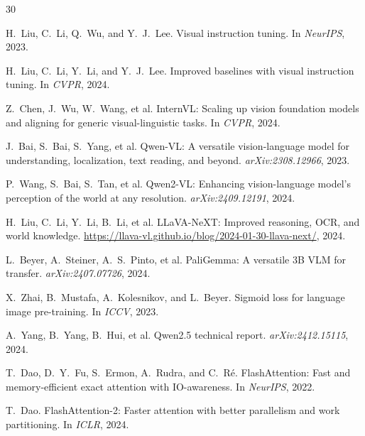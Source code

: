 \documentclass[11pt,a4paper]{article}
\begin{document}
\begin{thebibliography}{30}

H.~Liu, C.~Li, Q.~Wu, and Y.~J.~Lee.
\newblock Visual instruction tuning.
\newblock In \emph{NeurIPS}, 2023.

H.~Liu, C.~Li, Y.~Li, and Y.~J.~Lee.
\newblock Improved baselines with visual instruction tuning.
\newblock In \emph{CVPR}, 2024.

Z.~Chen, J.~Wu, W.~Wang, et al.
\newblock InternVL: Scaling up vision foundation models and aligning for generic visual-linguistic tasks.
\newblock In \emph{CVPR}, 2024.

J.~Bai, S.~Bai, S.~Yang, et al.
\newblock Qwen-VL: A versatile vision-language model for understanding, localization, text reading, and beyond.
\newblock \emph{arXiv:2308.12966}, 2023.

P.~Wang, S.~Bai, S.~Tan, et al.
\newblock Qwen2-VL: Enhancing vision-language model's perception of the world at any resolution.
\newblock \emph{arXiv:2409.12191}, 2024.

H.~Liu, C.~Li, Y.~Li, B.~Li, et al.
\newblock LLaVA-NeXT: Improved reasoning, OCR, and world knowledge.
\newblock \url{https://llava-vl.github.io/blog/2024-01-30-llava-next/}, 2024.

L.~Beyer, A.~Steiner, A.~S.~Pinto, et al.
\newblock PaliGemma: A versatile 3B VLM for transfer.
\newblock \emph{arXiv:2407.07726}, 2024.

X.~Zhai, B.~Mustafa, A.~Kolesnikov, and L.~Beyer.
\newblock Sigmoid loss for language image pre-training.
\newblock In \emph{ICCV}, 2023.

A.~Yang, B.~Yang, B.~Hui, et al.
\newblock Qwen2.5 technical report.
\newblock \emph{arXiv:2412.15115}, 2024.

T.~Dao, D.~Y.~Fu, S.~Ermon, A.~Rudra, and C.~R\'{e}.
\newblock FlashAttention: Fast and memory-efficient exact attention with IO-awareness.
\newblock In \emph{NeurIPS}, 2022.

T.~Dao.
\newblock FlashAttention-2: Faster attention with better parallelism and work partitioning.
\newblock In \emph{ICLR}, 2024.


\end{thebibliography}
\end{document}
